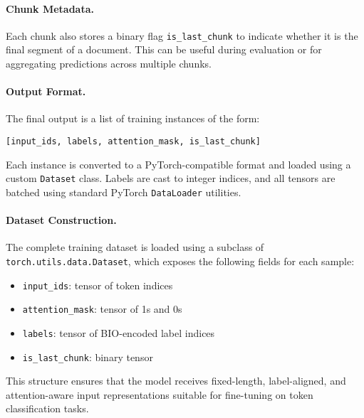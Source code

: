 \documentclass{article}
\begin{document}
\paragraph{Chunk Metadata.}

Each chunk also stores a binary flag \texttt{is\_last\_chunk} to indicate whether it is the final segment of a document. This can be useful during evaluation or for aggregating predictions across multiple chunks.

\paragraph{Output Format.}

The final output is a list of training instances of the form:
\begin{verbatim}
[input_ids, labels, attention_mask, is_last_chunk]
\end{verbatim}

Each instance is converted to a PyTorch-compatible format and loaded using a custom \texttt{Dataset} class. Labels are cast to integer indices, and all tensors are batched using standard PyTorch \texttt{DataLoader} utilities.

\paragraph{Dataset Construction.}

The complete training dataset is loaded using a subclass of \texttt{torch.utils.data.Dataset}, which exposes the following fields for each sample:
\begin{itemize}
    \item \texttt{input\_ids}: tensor of token indices
    \item \texttt{attention\_mask}: tensor of 1s and 0s
    \item \texttt{labels}: tensor of BIO-encoded label indices
    \item \texttt{is\_last\_chunk}: binary tensor
\end{itemize}

This structure ensures that the model receives fixed-length, label-aligned, and attention-aware input representations suitable for fine-tuning on token classification tasks.
\end{document}
